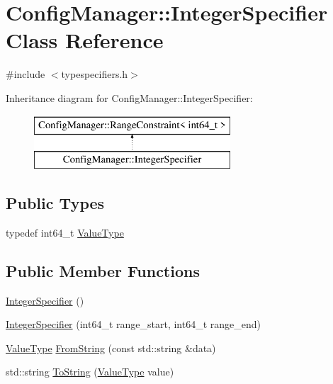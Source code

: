 \hypertarget{class_config_manager_1_1_integer_specifier}{}\section{Config\+Manager\+:\+:Integer\+Specifier Class Reference}
\label{class_config_manager_1_1_integer_specifier}


{\ttfamily \#include $<$typespecifiers.\+h$>$}

Inheritance diagram for Config\+Manager\+:\+:Integer\+Specifier\+:\begin{figure}[H]
\begin{center}
\leavevmode
\includegraphics[height=2.000000cm]{class_config_manager_1_1_integer_specifier}
\end{center}
\end{figure}
\subsection*{Public Types}
\begin{DoxyCompactItemize}
\item 
typedef int64\+\_\+t \hyperlink{class_config_manager_1_1_integer_specifier_acebb8d401c86a80ca658d74dd25d8853}{Value\+Type}
\end{DoxyCompactItemize}
\subsection*{Public Member Functions}
\begin{DoxyCompactItemize}
\item 
\hyperlink{class_config_manager_1_1_integer_specifier_af2aa1191b70cb1ec8c85571e552c39e9}{Integer\+Specifier} ()
\item 
\hyperlink{class_config_manager_1_1_integer_specifier_a9c460b5b768882830ba440d3c8320f9e}{Integer\+Specifier} (int64\+\_\+t range\+\_\+start, int64\+\_\+t range\+\_\+end)
\item 
\hyperlink{class_config_manager_1_1_integer_specifier_acebb8d401c86a80ca658d74dd25d8853}{Value\+Type} \hyperlink{class_config_manager_1_1_integer_specifier_ade30bcb4b98b53b259e1a1e94cb5b882}{From\+String} (const std\+::string \&data)
\item 
std\+::string \hyperlink{class_config_manager_1_1_integer_specifier_ac61b72758b7221bffb9afd9e770013d3}{To\+String} (\hyperlink{class_config_manager_1_1_integer_specifier_acebb8d401c86a80ca658d74dd25d8853}{Value\+Type} value)
\end{DoxyCompactItemize}


